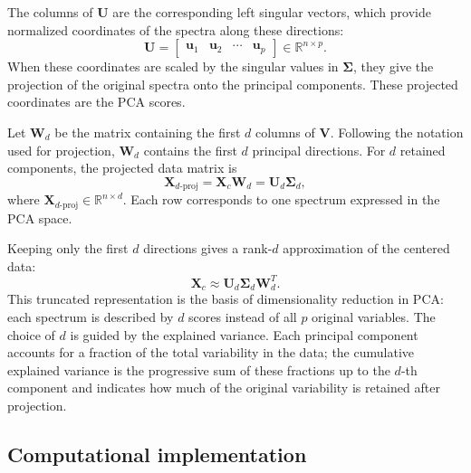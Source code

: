 The columns of \(\mathbf{U}\) are the corresponding left singular vectors, which provide
normalized coordinates of the spectra along these directions:
\begin{equation}
    \mathbf{U} =
    \begin{bmatrix}
    \mathbf{u}_1 & \mathbf{u}_2 & \cdots & \mathbf{u}_p
    \end{bmatrix}
    \in \mathbb{R}^{n \times p}.
    \label{eq:pca_u_matrix}
\end{equation}
When these coordinates are scaled by the singular values in \(\boldsymbol{\Sigma}\), they
give the projection of the original spectra onto the principal components. These projected
coordinates are the PCA scores.

Let \(\mathbf{W}_d\) be the matrix containing the first \(d\) columns of
\(\mathbf{V}\). Following the notation used for projection, \(\mathbf{W}_d\) contains the
first \(d\) principal directions. For \(d\) retained components, the projected data matrix
is
\begin{equation}
    \mathbf{X}_{d\text{-proj}} =
    \mathbf{X}_c \mathbf{W}_d =
    \mathbf{U}_d\boldsymbol{\Sigma}_d,
    \label{eq:pca_scores_svd}
\end{equation}
where \(\mathbf{X}_{d\text{-proj}} \in \mathbb{R}^{n \times d}\). Each row corresponds
to one spectrum expressed in the PCA space.

Keeping only the first \(d\) directions gives a rank-\(d\) approximation of the centered
data:
\begin{equation}
    \mathbf{X}_c \approx
    \mathbf{U}_d\boldsymbol{\Sigma}_d\mathbf{W}_d^{T}.
    \label{eq:pca_low_rank}
\end{equation}
This truncated representation is the basis of dimensionality reduction in PCA: each
spectrum is described by \(d\) scores instead of all \(p\) original variables. The choice
of \(d\) is guided by the explained variance. Each principal component accounts for a
fraction of the total variability in the data; the cumulative explained variance is the
progressive sum of these fractions up to the \(d\)-th component and indicates
how much of the original variability is retained after projection.

 

\subsection{Computational implementation}
\label{subsec:pca_computational_implementation}

